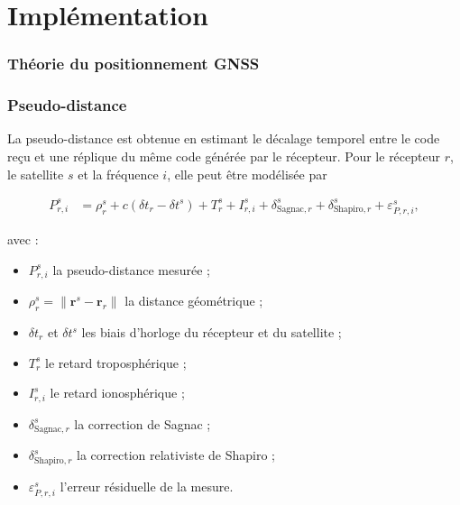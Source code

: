 
\chapter{Implémentation}

\subsection{Théorie du positionnement GNSS}



\subsection{Pseudo-distance}

La pseudo-distance est obtenue en estimant le décalage temporel entre le code
reçu et une réplique du même code générée par le récepteur. Pour le récepteur
$r$, le satellite $s$ et la fréquence $i$, elle peut être modélisée par

\begin{align}
P_{r,i}^s
&=
\rho_r^s
+c\left(\delta t_r-\delta t^s\right)
+T_r^s
+I_{r,i}^s
+\delta_{\mathrm{Sagnac},r}^s
+\delta_{\mathrm{Shapiro},r}^s
+\varepsilon_{P,r,i}^s ,
\label{eq:rho_i}
\end{align}

avec :

\begin{itemize}
    \item $P_{r,i}^s$ la pseudo-distance mesurée ;
    \item $\rho_r^s=\|\mathbf r^s-\mathbf r_r\|$ la distance géométrique ;
    \item $\delta t_r$ et $\delta t^s$ les biais d'horloge du récepteur et du
    satellite ;
    \item $T_r^s$ le retard troposphérique ;
    \item $I_{r,i}^s$ le retard ionosphérique ;
    \item $\delta_{\mathrm{Sagnac},r}^s$ la correction de Sagnac ;
    \item $\delta_{\mathrm{Shapiro},r}^s$ la correction relativiste de Shapiro ;
    \item $\varepsilon_{P,r,i}^s$ l'erreur résiduelle de la mesure.
\end{itemize}

